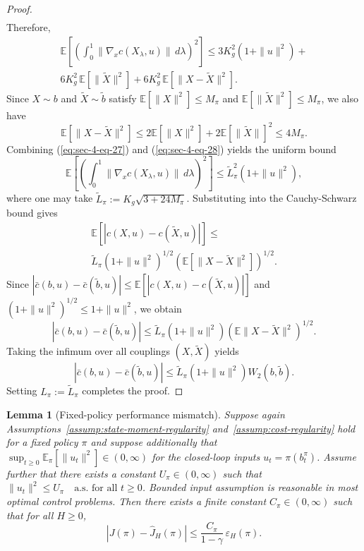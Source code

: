 \documentclass[letterpaper, 10 pt, conference]{ieeeconf}
\newtheorem{lemma}{Lemma}
\begin{document}
\begin{proof}
\begin{multline}
\end{multline}
Therefore,
\begin{multline}
\label{eq:sec-4-eq-27}
\mathbb{E}\!\left[\left(\int_0^1 \|\nabla_x c(X_\lambda,u)\|\,d\lambda\right)^2\right]
\le
3K_g^2\left(1+\|u\|^2\right)
+ \\
6K_g^2\,\mathbb{E}[\|\tilde X\|^2]
+
6K_g^2\,\mathbb{E}[\|X-\tilde X\|^2].
\end{multline}
Since $X\sim b$ and $\tilde X\sim \tilde b$ satisfy $\mathbb{E}[\|X\|^2] \le M_\pi$ and $\mathbb{E}[\|\tilde X\|^2] \le M_\pi$, we also have
\begin{equation}
\label{eq:sec-4-eq-28}
\mathbb{E}[\|X-\tilde X\|^2] \le 2\mathbb{E}[\|X\|^2] + 2\mathbb{E}[\|\tilde X\|]^2 \le 4M_\pi.
\end{equation}
Combining (\ref{eq:sec-4-eq-27}) and (\ref{eq:sec-4-eq-28}) yields the uniform bound
\begin{equation}
\mathbb{E}\!\left[\left(\int_0^1 \|\nabla_x c(X_\lambda,u)\|\,d\lambda\right)^2\right]
\le
\tilde L_\pi^2\left(1+\|u\|^2\right),
\end{equation}
where one may take $\tilde L_\pi:=K_g\sqrt{3+24M_\pi}$.
Substituting into the Cauchy-Schwarz bound gives
\begin{multline}
\mathbb{E}\!\left[|c(X,u)-c(\tilde X,u)|\right]
\le \\
\tilde L_\pi\left(1+\|u\|^2\right)^{1/2}\left(\mathbb{E}[\|X-\tilde X\|^2]\right)^{1/2}.
\end{multline}
Since $\left|\bar c(b,u)-\bar c(\tilde b,u)\right|\le \mathbb{E}\!\left[|c(X,u)-c(\tilde X,u)|\right]$ and $(1+\|u\|^2)^{1/2}\le 1+\|u\|^2$, we obtain
\begin{equation}
\left|\bar c(b,u)-\bar c(\tilde b,u)\right|
\le
\tilde L_\pi\left(1+\|u\|^2\right)\left(\mathbb{E}\|X-\tilde X\|^2\right)^{1/2}.
\end{equation}
Taking the infimum over all couplings $(X,\tilde X)$ yields
\begin{equation}
\left|\bar c(b,u)-\bar c(\tilde b,u)\right|
\le
\tilde L_\pi\left(1+\|u\|^2\right)W_2(b,\tilde b).
\end{equation}
Setting $L_\pi:=\tilde L_\pi$ completes the proof.
\end{proof}

\begin{lemma}[Fixed-policy performance mismatch]
\label{lem:fixed-policy-mismatch}
Suppose again Assumptions~\ref{assump:state-moment-regularity} and~\ref{assump:cost-regularity} hold for a fixed policy $\pi$ and suppose additionally that $\sup_{t\ge 0}\mathbb{E}_\pi[\|u_t\|^2]\in (0, \infty)$ for the closed-loop inputs $u_t=\pi(b_t^\pi)$.
Assume further that there exists a constant $U_\pi\in (0, \infty)$ such that $\|u_t\|^2 \le U_\pi \quad\text{a.s. for all } t\ge 0$. Bounded input assumption is reasonable in most optimal control problems.
Then there exists a finite constant $C_\pi\in (0, \infty)$ such that for all $H\ge 0$,
\begin{equation}
\left|J(\pi)-\hat J_H(\pi)\right| \le \frac{C_\pi}{1-\gamma}\,\varepsilon_H(\pi).
\end{equation}
\end{lemma}
\end{document}
